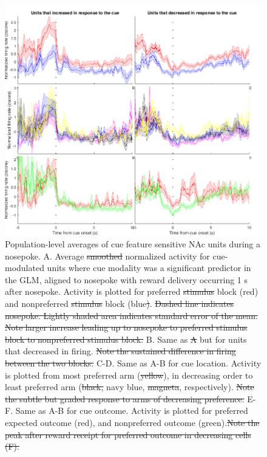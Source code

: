 \documentclass[11pt]{article}
\providecommand{\DIFadd}[1]{{\protect\color{blue}\uwave{#1}}} %
\providecommand{\DIFdel}[1]{{\protect\color{red}\sout{#1}}}                      %
\providecommand{\DIFaddFL}[1]{\DIFadd{#1}} %
\providecommand{\DIFdelFL}[1]{\DIFdel{#1}} %
\providecommand{\DIFaddbeginFL}{} %
\providecommand{\DIFaddendFL}{} %
\providecommand{\DIFdelbeginFL}{} %
\providecommand{\DIFdelendFL}{} %
\newcommand{\DIFscaledelfig}{0.5}
\newlength{\DIFdelgraphicswidth} %
\newlength{\DIFdelgraphicsheight} %
\newcommand{\DIFaddincludegraphics}[2][]{{\color{blue}\fbox{\DIFOincludegraphics[#1]{#2}}}} %
\newcommand{\DIFdelincludegraphics}[2][]{%
\sbox{\DIFdelgraphicsbox}{\DIFOincludegraphics[#1]{#2}}%
\settoboxwidth{\DIFdelgraphicswidth}{\DIFdelgraphicsbox} %
\settoboxtotalheight{\DIFdelgraphicsheight}{\DIFdelgraphicsbox} %
\scalebox{\DIFscaledelfig}{%
\parbox[b]{\DIFdelgraphicswidth}{\usebox{\DIFdelgraphicsbox}\\[-\baselineskip] \rule{\DIFdelgraphicswidth}{0em}}\llap{\resizebox{\DIFdelgraphicswidth}{\DIFdelgraphicsheight}{%
\setlength{\unitlength}{\DIFdelgraphicswidth}%
\begin{picture}(1,1)%
\thicklines\linethickness{2pt} %
{\color[rgb]{1,0,0}\put(0,0){\framebox(1,1){}}}%
{\color[rgb]{1,0,0}\put(0,0){\line( 1,1){1}}}%
{\color[rgb]{1,0,0}\put(0,1){\line(1,-1){1}}}%
\end{picture}%
}\hspace*{3pt}}} %
} %
\DeclareRobustCommand{\DIFaddbeginFL}{\DIFOaddbeginFL \let\includegraphics\DIFaddincludegraphics} %
\DeclareRobustCommand{\DIFaddendFL}{\DIFOaddendFL \let\includegraphics\DIFOincludegraphics} %
\DeclareRobustCommand{\DIFdelbeginFL}{\DIFOdelbeginFL \let\includegraphics\DIFdelincludegraphics} %
\DeclareRobustCommand{\DIFdelendFL}{\DIFOaddendFL \let\includegraphics\DIFOincludegraphics} %
\begin{document}
\begin{figure}[h]
\label{fig:NP_GLM}
\end{figure}
\begin{figure}[h]
\centering
\includegraphics[width=\textwidth]{Fig 10 - NP population averages.png}
\caption{Population-level averages of cue feature sensitive NAc units during a nosepoke. A. Average \DIFdelbeginFL \DIFdelFL{smoothed }\DIFdelendFL normalized activity for cue-modulated units where cue modality was a significant predictor in the GLM, aligned to nosepoke with reward delivery occurring 1 s after nosepoke. Activity is plotted for preferred \DIFdelbeginFL \DIFdelFL{stimulus }\DIFdelendFL block (red) and nonpreferred \DIFdelbeginFL \DIFdelFL{stimulus }\DIFdelendFL block (blue\DIFdelbeginFL \DIFdelFL{)}\DIFdelendFL . \DIFdelbeginFL \DIFdelFL{Dashed line indicates nosepoke. Lightly shaded area indicates standard error of the mean. Note larger increase leading up to nosepoke to preferred stimulus block to nonpreferred stimulus block. }\DIFdelendFL B. Same as \DIFdelbeginFL \DIFdelFL{A }\DIFdelendFL but for units that decreased in firing. \DIFdelbeginFL \DIFdelFL{Note the sustained difference in firing between the two blocks. }\DIFdelendFL C-D. Same as A-B for cue location. Activity is plotted from most preferred arm (\DIFdelbeginFL \DIFdelFL{yellow}\DIFdelendFL \DIFaddbeginFL \DIFaddFL{cyan}\DIFaddendFL ), in decreasing order to least preferred arm (\DIFdelbeginFL \DIFdelFL{black, }\DIFdelendFL navy blue, \DIFdelbeginFL \DIFdelFL{magneta}\DIFdelendFL \DIFaddbeginFL \DIFaddFL{green}\DIFaddendFL , \DIFaddbeginFL \DIFaddFL{red, }\DIFaddendFL respectively). \DIFdelbeginFL \DIFdelFL{Note the subtle but graded response to arms of decreasing preference. }\DIFdelendFL E-F. Same as A-B for cue outcome. Activity is plotted for preferred expected outcome (red), and nonpreferred outcome (green).\DIFdelbeginFL \DIFdelFL{Note the peak after reward receipt for preferred outcome in decreasing cells (F).}\DIFdelendFL }
\label{fig:NP_pop}
\end{figure}
\end{document}

